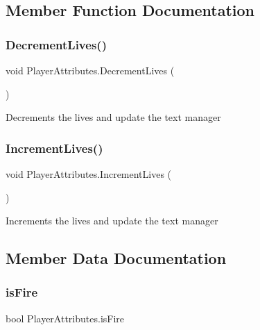 \subsection{Member Function Documentation}
\mbox{\label{class_player_attributes_ae04bfec3ffddefb521aca753c9b832ea}} 
\subsubsection{\texorpdfstring{Decrement\+Lives()}{DecrementLives()}}
{\footnotesize\ttfamily void Player\+Attributes.\+Decrement\+Lives (\begin{DoxyParamCaption}{ }\end{DoxyParamCaption})}



Decrements the lives and update the text manager 

\mbox{\label{class_player_attributes_a0dfec30b6ea5d4246790c1038c6e4c45}} 
\subsubsection{\texorpdfstring{Increment\+Lives()}{IncrementLives()}}
{\footnotesize\ttfamily void Player\+Attributes.\+Increment\+Lives (\begin{DoxyParamCaption}{ }\end{DoxyParamCaption})}



Increments the lives and update the text manager 



\subsection{Member Data Documentation}
\mbox{\label{class_player_attributes_a4bb2a3a44344d0e8e05ffd3c02b5e66c}} 
\subsubsection{\texorpdfstring{is\+Fire}{isFire}}
{\footnotesize\ttfamily bool Player\+Attributes.\+is\+Fire}



